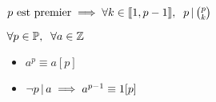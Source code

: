 \begin{lem}
$p \text{ est premier} \implies \forall k \in \llbracket 1, p - 1 \rrbracket, \;\;
p \operatorname{|} \binom{p}{k}$
\end{lem}

\begin{prp}
$\forall p \in \mathbb{P}, \;\; \forall a \in \mathbb{Z}$
\begin{itemize}
    \item $a^p \equiv a [p]$
    \item $\neg p \operatorname{|} a \implies a^{p - 1} \equiv 1 [p]$
\end{itemize}
\end{prp}


